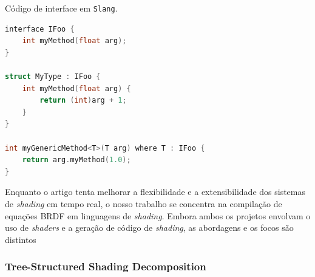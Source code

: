 \begin{codigo}[H]
  \caption{\small Código de interface em \texttt{Slang}. }
  \label{cod-sland}
\begin{lstlisting}[language=C, frame=none, inputencoding=utf8]
interface IFoo {
    int myMethod(float arg);
}

struct MyType : IFoo {
    int myMethod(float arg) {
        return (int)arg + 1;
    }
}

int myGenericMethod<T>(T arg) where T : IFoo {
    return arg.myMethod(1.0);
}
\end{lstlisting}
\end{codigo}

Enquanto o artigo tenta melhorar a flexibilidade e a extensibilidade dos sistemas de \textit{shading} em tempo real, o nosso trabalho se concentra na compilação de equações BRDF em linguagens de \textit{shading}. Embora ambos os projetos envolvam o uso de \textit{shaders} e a geração de código de \textit{shading}, as abordagens e os focos são distintos

\subsubsection{Tree-Structured Shading Decomposition}



